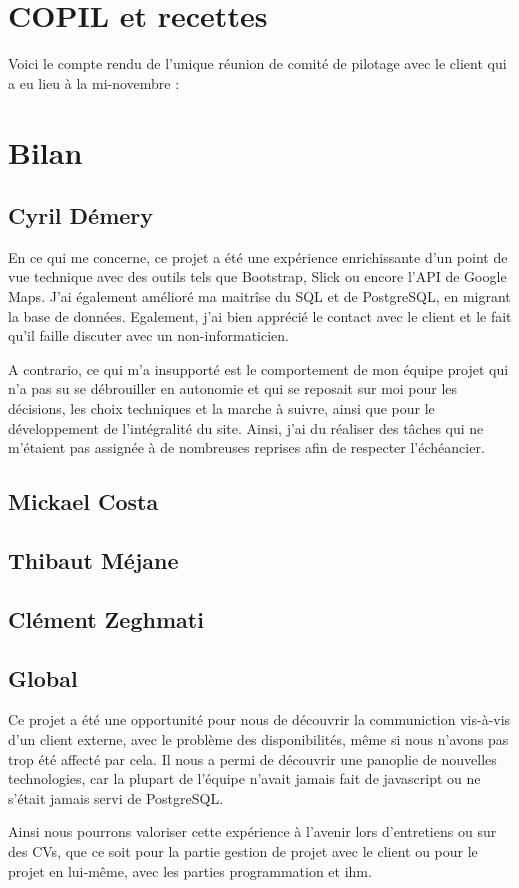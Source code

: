 \documentclass[11pt]{report}
\begin{document}
\section{COPIL et recettes}
Voici le compte rendu de l'unique réunion de comité de pilotage avec le client
qui a eu lieu à la mi-novembre : 
\begin{landscape}

\end{landscape}
\clearpage

\begin{landscape}

\end{landscape}
\clearpage

\section{Bilan}
\subsection{Cyril Démery}
En ce qui me concerne, ce projet a été une expérience enrichissante d'un point de vue technique avec des outils tels que Bootstrap, Slick ou encore l'API de Google Maps. J'ai également amélioré ma maitrîse du SQL et de PostgreSQL, en migrant la base de données. Egalement, j'ai bien apprécié le contact avec le client et le fait qu'il faille discuter avec un non-informaticien. \\
\par A contrario, ce qui m'a insupporté est le comportement de mon équipe projet qui n'a pas su se débrouiller en autonomie et qui se reposait sur moi pour les décisions, les choix techniques et la marche à suivre, ainsi que pour le développement de l'intégralité du site. Ainsi, j'ai du réaliser des tâches qui ne m'étaient pas assignée à de nombreuses reprises afin de respecter l'échéancier.
\subsection{Mickael Costa}
\subsection{Thibaut Méjane}
\subsection{Clément Zeghmati}
\subsection{Global}
Ce projet a été une opportunité pour nous de découvrir la communiction vis-à-vis d'un client externe, avec le problème des disponibilités, même si nous n'avons pas trop été affecté par cela. Il nous a permi de découvrir une panoplie de nouvelles technologies, car la plupart de l'équipe n'avait jamais fait de javascript ou ne s'était jamais servi de PostgreSQL. \\
\par Ainsi nous pourrons valoriser cette expérience à l'avenir lors d'entretiens ou sur des CVs, que ce soit pour la partie gestion de projet avec le client ou pour le projet en lui-même, avec les parties programmation et ihm.
\end{document}
